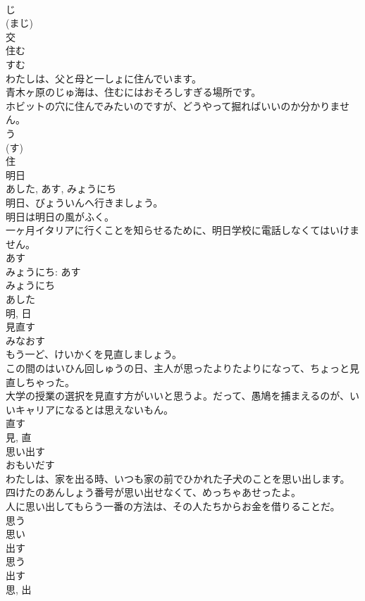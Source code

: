 \documentclass[8pt]{extreport}
\begin{document}
\begin{CJK}{UTF8}{min}
\\	じ 
\\	(まじ) 
\\	交	
\\	住む	
\\	すむ	
\\	わたしは、父と母と一しょに住んでいます。	
\\	青木ヶ原のじゅ海は、住むにはおそろしすぎる場所です。	
\\	ホビットの穴に住んでみたいのですが、どうやって掘ればいいのか分かりません。	
\\	う 
\\	(す) 
\\	住	
\\	明日	
\\	あした, あす, みょうにち	
\\	明日、びょういんへ行きましょう。	
\\	明日は明日の風がふく。	
\\	一ヶ月イタリアに行くことを知らせるために、明日学校に電話しなくてはいけません。	
\\	あす 
\\	みょうにち: あす 
\\	みょうにち 
\\	あした 
\\	明, 日	
\\	見直す	
\\	みなおす	
\\	もう一ど、けいかくを見直しましょう。	
\\	この間のはいひん回しゅうの日、主人が思ったよりたよりになって、ちょっと見直しちゃった。	
\\	大学の授業の選択を見直す方がいいと思うよ。だって、愚鳩を捕まえるのが、いいキャリアになるとは思えないもん。	
\\	直す 
\\	見, 直	
\\	思い出す	
\\	おもいだす	
\\	わたしは、家を出る時、いつも家の前でひかれた子犬のことを思い出します。	
\\	四けたのあんしょう番号が思い出せなくて、めっちゃあせったよ。	
\\	人に思い出してもらう一番の方法は、その人たちからお金を借りることだ。	
\\	思う 
\\	思い 
\\	出す 
\\	思う 
\\	出す 
\\	思, 出	

\end{CJK}
\end{document}
